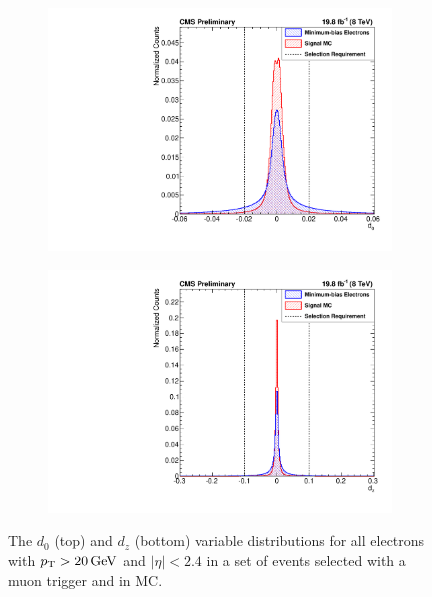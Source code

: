 \begin{figure}[!htbp]
    \centering
    \begin{subfigure}[b]{\StackedPlotWidth}
        \includegraphics[width=\textwidth]{figures/e_reco_var_d0.pdf}
        \caption{}
        \label{fig:d0}
    \end{subfigure}
    \begin{subfigure}[b]{\StackedPlotWidth}
        \includegraphics[width=\textwidth]{figures/e_reco_var_dz.pdf}
        \caption{}
        \label{fig:dz}
    \end{subfigure}
    \caption[
        Distributions of $d_{0}$ and $d_{z}$ in data and MC.
    ]{
        The $d_{0}$ (top) and $d_{z}$ (bottom) variable distributions for all
        electrons with $p_{\mathrm{T}} > 20 \,\text{Ge\hspace{-.08em}V}$ and $|\eta| < 2.4$ in a set of events
        selected with a muon trigger and in \MADGRAPH \Ztoee MC.
    }
    \label{fig:d0_dz}
\end{figure}

